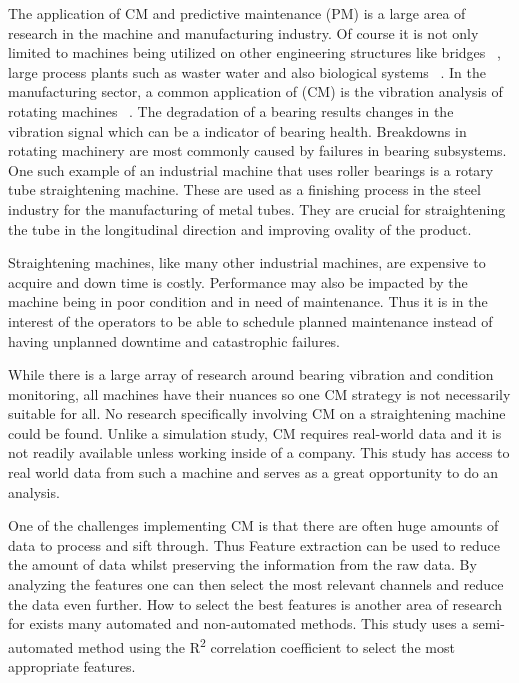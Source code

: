 \documentclass[]{article}
\begin{document}
The application of CM and predictive maintenance (\gls{PM}) is a large area of research in the machine and manufacturing industry. Of course it is not only limited to machines being utilized on other engineering structures like bridges ~\cite{buckley2023feature}, large process plants such as waster water and also biological systems ~\cite{tolocsi2011classification}. 
In the manufacturing sector, a common application of (\gls{CM}) is the vibration analysis of rotating machines ~\cite{tiboni2022review}. The degradation of a bearing results changes in the vibration signal which can be a indicator of bearing health. 
Breakdowns in rotating machinery are most commonly caused by failures in bearing subsystems. One such example of an industrial machine that uses roller bearings is a rotary tube straightening machine. These are used as a finishing process in the steel industry for the manufacturing of metal tubes. They are crucial for straightening the tube in the longitudinal direction and improving ovality of the product. 

Straightening machines, like many other industrial machines, are expensive to acquire and down time is costly. Performance may also be impacted by the machine being in poor condition and in need of maintenance. Thus it is in the interest of the operators to be able to schedule planned maintenance instead of having unplanned downtime and catastrophic failures.

While there is a large array of research around bearing vibration and condition monitoring, all machines have their nuances so one CM strategy is not necessarily suitable for all. No research specifically involving CM on a straightening machine could be found. Unlike a simulation study, CM requires real-world data and it is not readily available unless working inside of a company. This study has access to real world data from such a machine and serves as a great opportunity to do an analysis.

One of the challenges implementing CM is that there are often huge amounts of data to process and sift through. Thus Feature extraction can be used to reduce the amount of data whilst preserving the information from the raw data. By analyzing the features one can then select the most relevant channels and reduce the data even further. How to select the best features is another area of research for exists many automated and non-automated methods. This study uses a semi-automated method using the R\textsuperscript{2} correlation coefficient to select the most appropriate features.
\end{document}
